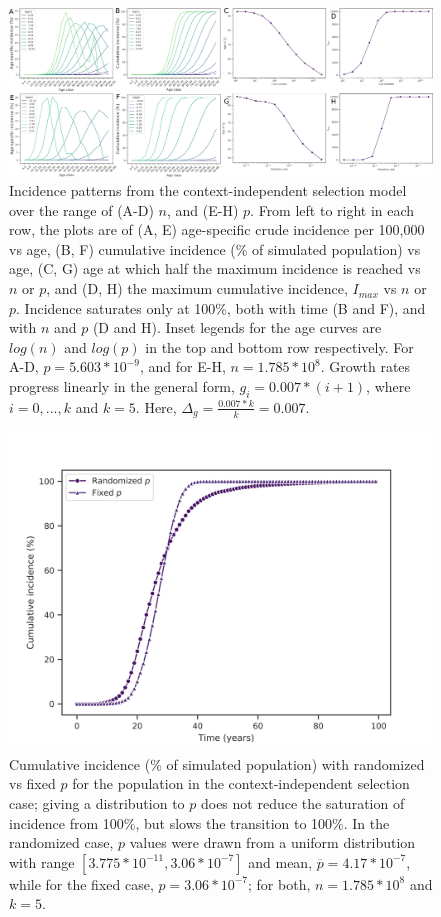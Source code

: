 \documentclass[9pt,twocolumn,twoside]{pnas-new}
\begin{document}
\begin{figure}[!ht]
	\centering
	\includegraphics[width=\linewidth]{fig3.png}
	\caption{Incidence patterns from the context-independent selection model over the range of (A-D) $n$, and (E-H) $p$. From left to right in each row, the plots are of (A, E) age-specific crude incidence per 100,000 vs age, (B, F) cumulative incidence (\% of simulated population) vs age, (C, G) age at which half the maximum incidence is reached vs $n$ or $p$, and (D, H) the maximum cumulative incidence, $I_{max}$ vs $n$ or $p$. Incidence saturates only at 100\%, both with time (B and F), and with $n$ and $p$ (D and H). Inset legends for the age curves are $log(n)$ and $log(p)$ in the top and bottom row respectively. For A-D, $p=5.603*10^{-9}$, and for E-H, $n=1.785*10^{8}$. Growth rates progress linearly in the general form, $g_{i}=0.007*(i+1)$, where $i=0,...,k$ and $k=5$. Here, $\Delta_{g}=\frac{0.007*k}{k}=0.007$.}
	\label{fig3}
\end{figure}

\begin{figure}[!ht]
	\centering
	\includegraphics[width=\linewidth, keepaspectratio=true]{fig4.png}
	\caption{Cumulative incidence (\% of simulated population) with randomized vs fixed $p$ for the population in the context-independent selection case; giving a distribution to $p$ does not reduce the saturation of incidence from 100\%, but slows the transition to 100\%. In the randomized case, $p$ values were drawn from a uniform distribution with range $[3.775*10^{-11}, 3.06*10^{-7}]$ and mean, $\overline{p} = 4.17*10^{-7}$, while for the fixed case, $p=3.06*10^{-7}$; for both, $n=1.785*10^{8}$ and $k=5$.} 
	\label{fig4}
\end{figure}
\end{document}
